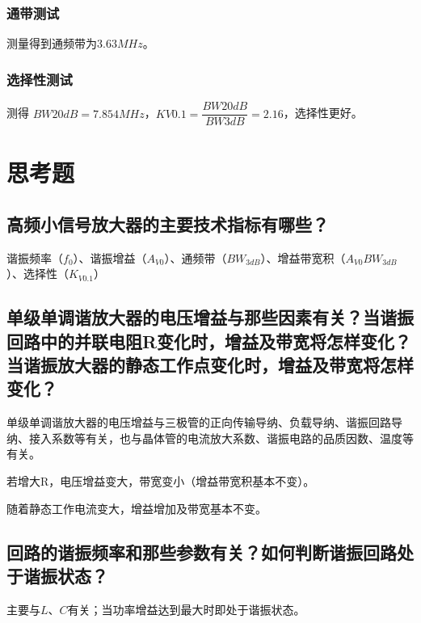 \documentclass{../source/Experiment}
\begin{document}
            \subsubsection{通带测试}

            测量得到通频带为$3.63MHz$。
            
            \subsubsection{选择性测试}

            测得 $BW20dB = 7.854MHz$，$ KV 0.1 =\dfrac{BW20dB}{BW3dB}=2.16$，选择性更好。


    \section{思考题}
	    \subsection{高频小信号放大器的主要技术指标有哪些？}
	
        谐振频率（$f_0$）、谐振增益（$A_{V0}$）、通频带（$BW_{3dB}$）、增益带宽积（$A_{V0}BW_{3dB}$）、选择性（$K_{V0.1}$）
        
        \subsection{单级单调谐放大器的电压增益与那些因素有关？当谐振回路中的并联电阻R变化时，增益及带宽将怎样变化？当谐振放大器的静态工作点变化时，增益及带宽将怎样变化？}
        
        单级单调谐放大器的电压增益与三极管的正向传输导纳、负载导纳、谐振回路导纳、接入系数等有关，也与晶体管的电流放大系数、谐振电路的品质因数、温度等有关。
        
        若增大R，电压增益变大，带宽变小（增益带宽积基本不变）。

        随着静态工作电流变大，增益增加及带宽基本不变。

        \subsection{回路的谐振频率和那些参数有关？如何判断谐振回路处于谐振状态？}
	
	    主要与$L$、$C$有关；当功率增益达到最大时即处于谐振状态。
	
\end{document}
